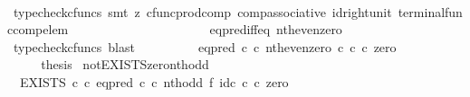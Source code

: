 \begin{isabellebody}
\ \ \ \ \ \ \ \ \isamarkupfalse%
\ {\isacharparenleft}{\kern0pt}typecheck{\isacharunderscore}{\kern0pt}cfuncs{\isacharcomma}{\kern0pt}\ smt\ {\isacharparenleft}{\kern0pt}z{}{\isacharparenright}{\kern0pt}\ cfunc{\isacharunderscore}{\kern0pt}prod{\isacharunderscore}{\kern0pt}comp\ comp{\isacharunderscore}{\kern0pt}associative{}\ id{\isacharunderscore}{\kern0pt}right{\isacharunderscore}{\kern0pt}unit{}\ terminal{\isacharunderscore}{\kern0pt}func{\isacharunderscore}{\kern0pt}comp{\isacharunderscore}{\kern0pt}elem{\isacharparenright}{\kern0pt}\isanewline
\ \ \ \ \ \ \isamarkupfalse%
\ \isamarkupfalse%
\ {\isachardoublequoteopen}{\isachardot}{\kern0pt}{\isachardot}{\kern0pt}{\isachardot}{\kern0pt}\ {\isacharequal}{\kern0pt}\ {\isasymt}{\isachardoublequoteclose}\isanewline
\ \ \ \ \ \ \ \ \isamarkupfalse%
\ eq{\isacharunderscore}{\kern0pt}pred{\isacharunderscore}{\kern0pt}iff{\isacharunderscore}{\kern0pt}eq\ nth{\isacharunderscore}{\kern0pt}even{\isacharunderscore}{\kern0pt}zero\ \isamarkupfalse%
\ {\isacharparenleft}{\kern0pt}typecheck{\isacharunderscore}{\kern0pt}cfuncs{\isacharcomma}{\kern0pt}\ blast{\isacharparenright}{\kern0pt}\isanewline
\ \ \ \ \ \ \isamarkupfalse%
\ \isamarkupfalse%
\ {\isachardoublequoteopen}{\isacharparenleft}{\kern0pt}eq{\isacharunderscore}{\kern0pt}pred\ {\isasymnat}\isactrlsub c\ {\isasymcirc}\isactrlsub c\ {\isasymlangle}nth{\isacharunderscore}{\kern0pt}even{\isacharcomma}{\kern0pt}zero\ {\isasymcirc}\isactrlsub c\ {\isasymbeta}\isactrlbsub {\isasymnat}\isactrlsub c\isactrlesub {\isasymrangle}{\isacharparenright}{\kern0pt}\ {\isasymcirc}\isactrlsub c\ zero\ {\isacharequal}{\kern0pt}\ {\isasymt}{\isachardoublequoteclose}\isacommand{{\isachardot}{\kern0pt}}\isamarkupfalse%
\isanewline
\ \ \ \ \isamarkupfalse%
\isanewline
\ \ \isamarkupfalse%
\isanewline
\ \ \isamarkupfalse%
\ \isamarkupfalse%
\ {\isacharquery}{\kern0pt}thesis\isacommand{{\isachardot}{\kern0pt}}\isamarkupfalse%
\isanewline
{}\isamarkupfalse%
%
\endisatagproof
{\isafoldproof}%
%
\isadelimproof
\isanewline
%
\endisadelimproof
\isanewline
{}\isamarkupfalse%
\ not{\isacharunderscore}{\kern0pt}EXISTS{\isacharunderscore}{\kern0pt}zero{\isacharunderscore}{\kern0pt}nth{\isacharunderscore}{\kern0pt}odd{\isacharcolon}{\kern0pt}\isanewline
\ \ {\isachardoublequoteopen}{\isacharparenleft}{\kern0pt}EXISTS\ {\isasymnat}\isactrlsub c\ {\isasymcirc}\isactrlsub c\ {\isacharparenleft}{\kern0pt}eq{\isacharunderscore}{\kern0pt}pred\ {\isasymnat}\isactrlsub c\ {\isasymcirc}\isactrlsub c\ nth{\isacharunderscore}{\kern0pt}odd\ {\isasymtimes}\isactrlsub f\ id\isactrlsub c\ {\isasymnat}\isactrlsub c{\isacharparenright}{\kern0pt}\isactrlsup {\isasymsharp}{\isacharparenright}{\kern0pt}\ {\isasymcirc}\isactrlsub c\ zero\ {\isacharequal}{\kern0pt}\ {\isasymf}{\isachardoublequoteclose}\isanewline

\end{isabellebody}

